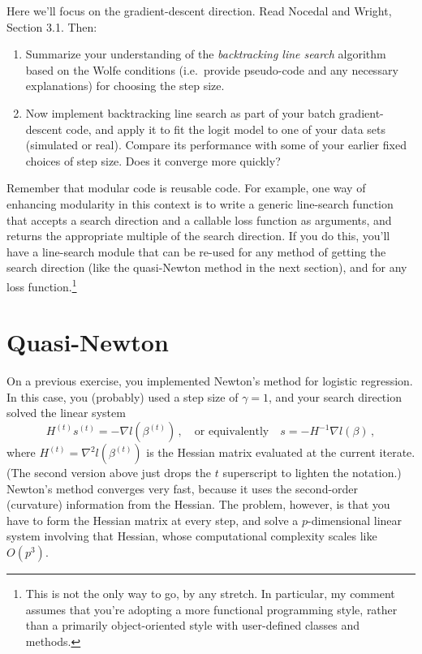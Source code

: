 \documentclass[11 pt]{article}
\begin{document}
Here we'll focus on the gradient-descent direction.  Read Nocedal and Wright, Section 3.1.  Then:

\begin{enumerate}[label=(\Alph*)]
	\item Summarize your understanding of the \textit{backtracking line search} algorithm based on the Wolfe conditions (i.e.~provide pseudo-code and any necessary explanations) for choosing the step size.
	\item Now implement backtracking line search as part of your batch gradient-descent code, and apply it to fit the logit model to one of your data sets (simulated or real).  Compare its performance with some of your earlier fixed choices of step size.  Does it converge more quickly?
\end{enumerate}

Remember that modular code is reusable code.  For example, one way of enhancing modularity in this context is to write a generic line-search function that accepts a search direction and a callable loss function as arguments, and returns the appropriate multiple of the search direction.  If you do this, you'll have a line-search module that can be re-used for any method of getting the search direction (like the quasi-Newton method in the next section), and for any loss function.\footnote{This is not the only way to go, by any stretch.  In particular, my comment assumes that you're adopting a more functional programming style, rather than a primarily object-oriented style with user-defined classes and methods.}


\section{Quasi-Newton}

On a previous exercise, you implemented Newton's method for logistic regression.  In this case, you (probably) used a step size of $\gamma = 1$, and your search direction solved the linear system
$$
H^{(t)} s^{(t)} = - \nabla l(\beta^{(t)}) \, , \quad \mbox{or equivalently} \quad  s = -H^{-1} \nabla l(\beta) \, ,
$$
where $H^{(t)} = \nabla^2 l(\beta^{(t)})$ is the Hessian matrix evaluated at the current iterate.  (The second version above just drops the $t$ superscript to lighten the notation.)    Newton's method converges very fast, because it uses the second-order (curvature) information from the Hessian.  The problem, however, is that you have to form the Hessian matrix at every step, and solve a $p$-dimensional linear system involving that Hessian, whose computational complexity scales like $O(p^3)$.
\end{document}
